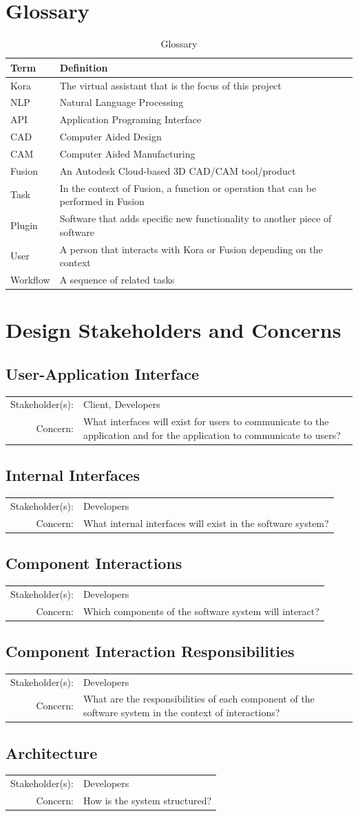 \documentclass[onecolumn, draftclsnofoot,10pt, compsoc]{IEEEtran}
\newcommand{\designConcernDef}[3]{
    \subsection{#1}
        \begin{tabular}[t]{r p{6in}}
            Stakeholder(s): & #2 \\
            Concern: & #3 \\
        \end{tabular}
}
\begin{document}
\section{Glossary}
	\begin{table}[H]
		\centering
		\caption{Glossary}
		\label{my-label}
		\begin{tabular}{|l|l|}
			\hline
			\textbf{Term} & \textbf{Definition} \\ \hline
			Kora & The virtual assistant that is the focus of this project \\ \hline
			NLP & Natural Language Processing \\ \hline
			API & Application Programing Interface \\ \hline
			CAD & Computer Aided Design \\ \hline
			CAM & Computer Aided Manufacturing \\ \hline
			Fusion & An Autodesk Cloud-based 3D CAD/CAM tool/product \\ \hline
			Task & In the context of Fusion, a function or operation that can be performed in Fusion \\ \hline
			Plugin & Software that adds specific new functionality to another piece of software \\ \hline
			User & A person that interacts with Kora or Fusion depending on the context \\ \hline
			Workflow & A sequence of related tasks \\ \hline
		\end{tabular}
	\end{table}

\section{Design Stakeholders and Concerns}
    \designConcernDef{User-Application Interface}{Client, Developers}{What interfaces will exist for users to communicate to the application and for the application to communicate to users?}
    \designConcernDef{Internal Interfaces}{Developers}{What internal interfaces will exist in the software system?}
    \designConcernDef{Component Interactions}{Developers}{Which components of the software system will interact?}
    \designConcernDef{Component Interaction Responsibilities}{Developers}{What are the responsibilities of each component of the software system in the context of interactions?}
	\designConcernDef{Architecture}{Developers}{How is the system structured?}
\end{document}
